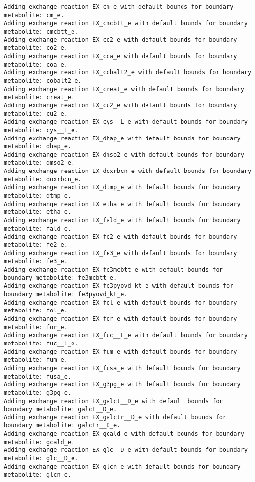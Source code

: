\documentclass[
  letterpaper,
  DIV=11,
  numbers=noendperiod]{scrartcl}
\begin{document}
\begin{verbatim}
Adding exchange reaction EX_cm_e with default bounds for boundary metabolite: cm_e.
Adding exchange reaction EX_cmcbtt_e with default bounds for boundary metabolite: cmcbtt_e.
Adding exchange reaction EX_co2_e with default bounds for boundary metabolite: co2_e.
Adding exchange reaction EX_coa_e with default bounds for boundary metabolite: coa_e.
Adding exchange reaction EX_cobalt2_e with default bounds for boundary metabolite: cobalt2_e.
Adding exchange reaction EX_creat_e with default bounds for boundary metabolite: creat_e.
Adding exchange reaction EX_cu2_e with default bounds for boundary metabolite: cu2_e.
Adding exchange reaction EX_cys__L_e with default bounds for boundary metabolite: cys__L_e.
Adding exchange reaction EX_dhap_e with default bounds for boundary metabolite: dhap_e.
Adding exchange reaction EX_dmso2_e with default bounds for boundary metabolite: dmso2_e.
Adding exchange reaction EX_doxrbcn_e with default bounds for boundary metabolite: doxrbcn_e.
Adding exchange reaction EX_dtmp_e with default bounds for boundary metabolite: dtmp_e.
Adding exchange reaction EX_etha_e with default bounds for boundary metabolite: etha_e.
Adding exchange reaction EX_fald_e with default bounds for boundary metabolite: fald_e.
Adding exchange reaction EX_fe2_e with default bounds for boundary metabolite: fe2_e.
Adding exchange reaction EX_fe3_e with default bounds for boundary metabolite: fe3_e.
Adding exchange reaction EX_fe3mcbtt_e with default bounds for boundary metabolite: fe3mcbtt_e.
Adding exchange reaction EX_fe3pyovd_kt_e with default bounds for boundary metabolite: fe3pyovd_kt_e.
Adding exchange reaction EX_fol_e with default bounds for boundary metabolite: fol_e.
Adding exchange reaction EX_for_e with default bounds for boundary metabolite: for_e.
Adding exchange reaction EX_fuc__L_e with default bounds for boundary metabolite: fuc__L_e.
Adding exchange reaction EX_fum_e with default bounds for boundary metabolite: fum_e.
Adding exchange reaction EX_fusa_e with default bounds for boundary metabolite: fusa_e.
Adding exchange reaction EX_g3pg_e with default bounds for boundary metabolite: g3pg_e.
Adding exchange reaction EX_galct__D_e with default bounds for boundary metabolite: galct__D_e.
Adding exchange reaction EX_galctr__D_e with default bounds for boundary metabolite: galctr__D_e.
Adding exchange reaction EX_gcald_e with default bounds for boundary metabolite: gcald_e.
Adding exchange reaction EX_glc__D_e with default bounds for boundary metabolite: glc__D_e.
Adding exchange reaction EX_glcn_e with default bounds for boundary metabolite: glcn_e.

\end{verbatim}
\end{document}
